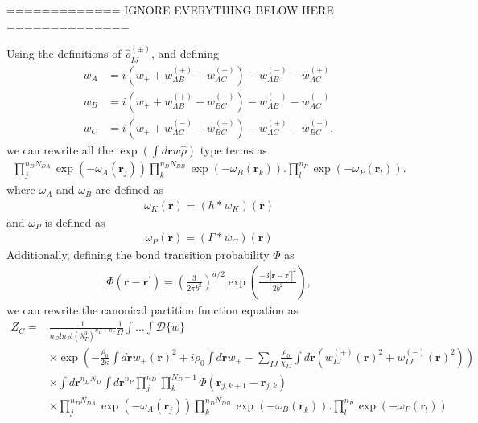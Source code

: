 \documentclass{article}
\begin{document}
============= IGNORE EVERYTHING BELOW HERE ==============

Using the definitions of $\hat{\rho}_{IJ}^{(\pm)}$, and defining
\begin{align*}
  w_A &=
    i \left( w_+ + w_{AB}^{(+)} + w_{AC}^{(-)} \right)
    - w_{AB}^{(-)} - w_{AC}^{(+)} \\
  w_B &=
    i \left( w_+ + w_{AB}^{(+)} + w_{BC}^{(+)} \right)
    - w_{AB}^{(-)} - w_{AC}^{(-)} \\
  w_C &=
    i \left( w_+ + w_{AC}^{(-)} + w_{BC}^{(+)} \right)
    - w_{AC}^{(+)} - w_{BC}^{(-)},
\end{align*}
  we can rewrite all the $\exp(\int d \mathbf{r} w\hat{\rho})$ type terms as
\begin{align*}
  \prod_{j}^{n_{D}N_{DA}}
  \exp \left( -\omega_A(\mathbf{r}_j) \right)
  \prod_{k}^{n_{D}N_{DB}}
  \exp \left( -\omega_B(\mathbf{r}_k) \right).
  \prod_{l}^{n_P}
  \exp \left( -\omega_P(\mathbf{r}_l) \right).
\end{align*}
where $\omega_A$ and $\omega_B$ are defined as
\begin{align*}
  \omega_K(\mathbf{r}) = (h \ast w_K)(\mathbf{r})
\end{align*}
and $\omega_P$ is defined as
\begin{align*}
  \omega_P(\mathbf{r}) = (\Gamma \ast w_C)(\mathbf{r})
\end{align*}
Additionally, defining the bond transition probability $\Phi$ as
\begin{align*}
  \Phi(\mathbf{r} - \mathbf{r}^\prime) =
    \left( \frac{3}{2\pi b^2} \right) ^ {d/2}
    \exp \left( \frac{-3| \mathbf{r} - \mathbf{r}^\prime |^2}{2b^2} \right),
\end{align*}
we can rewrite the canonical partition function equation as
\begin{align*}
  Z_C =& \frac{1}{n_D!n_P! \left( \lambda_T^3 \right)^{n_D+n_P}}
    \frac{1}{\Omega}
    \int \hdots \int \mathcal{D} \{w\} \\
    &\times
    \exp \left(
      - \frac{\rho_0}{2\kappa} \int d \mathbf{r} w_+(\mathbf{r})^2
      + i \rho_0 \int d\mathbf{r} w_+
      - \sum_{IJ}
      \frac{\rho_0}{\chi_{IJ}}
      \int d \mathbf{r}
      \left(
        w_{IJ}^{(+)} (\mathbf{r})^2 + w_{IJ}^{(-)} (\mathbf{r})^2
      \right)
    \right) \\
    &\times \int d \mathbf{r}^{n_DN_D} \int d \mathbf{r}^{n_P}
      \prod_j^{n_D} \prod_k^{N_D-1}
      \Phi(\mathbf{r}_{j,k+1} - \mathbf{r}_{j,k}) \\
    &\times
    \prod_{j}^{n_{D}N_{DA}} \exp \left( -\omega_A(\mathbf{r}_j) \right)
    \prod_{k}^{n_{D}N_{DB}} \exp \left( -\omega_B(\mathbf{r}_k) \right).
    \prod_{l}^{n_P}         \exp \left( -\omega_P(\mathbf{r}_l) \right)
\end{align*}
\end{document}

